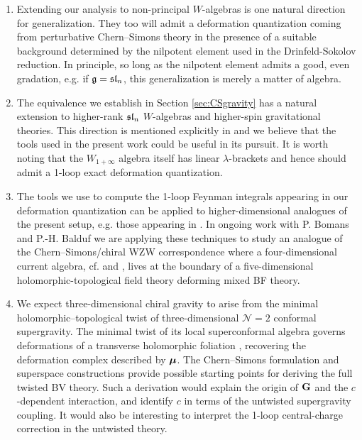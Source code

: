\documentclass[11pt]{amsart}
\numberwithin{equation}{section}
\numberwithin{figure}{section}
\numberwithin{table}{section}
\begin{document}
\begin{enumerate}
	\item Extending our analysis to non-principal $W$-algebras is one natural direction for generalization.
	They too will admit a deformation quantization coming from perturbative Chern--Simons theory in the presence of a suitable background determined by the nilpotent element used in the Drinfeld-Sokolov reduction.
	In principle, so long as the nilpotent element admits a good, even gradation, e.g. if $\mathfrak{g} = \mathfrak{sl}_n$, this generalization is merely a matter of algebra.
	\item The equivalence we establish in Section \ref{sec:CSgravity} has a natural extension to higher-rank $\mathfrak{sl}_n$ $W$-algebras and higher-spin gravitational theories.
	This direction is mentioned explicitly in \cite{Khan:2025rah} and we believe that the tools used in the present work could be useful in its pursuit.
	It is worth noting that the $W_{1+\infty}$ algebra itself has linear $\lambda$-brackets and hence should admit a 1-loop exact deformation quantization.
	\item The tools we use to compute the 1-loop Feynman integrals appearing in our deformation quantization can be applied to higher-dimensional analogues of the present setup, e.g. those appearing in \cite{Zeng:2026vry}.
	In ongoing work with P. Bomans and P.-H. Balduf we are applying these techniques to study an analogue of the Chern--Simons/chiral WZW correspondence where a four-dimensional current algebra, cf. \cite{Losev:1995cr, Losev:1996up, Losev1998} and \cite{Faonte2019389, Gwilliam:2018lpo}, lives at the boundary of a five-dimensional holomorphic-topological field theory deforming mixed BF theory.
	\item We expect three-dimensional chiral gravity to arise from the minimal holomorphic--topological twist of three-dimensional $\mathcal N=2$ conformal supergravity.
	The minimal twist of its local superconformal algebra governs deformations of a transverse holomorphic foliation \cite[Sec.~6.1]{Hahner:2024local}, recovering the deformation complex described by $\boldsymbol{\mu}$.
	The Chern--Simons formulation \cite{Rocek:1986conformal} and superspace constructions \cite{Kuzenko:2012prepotentials, Butter:2013actions} provide possible starting points for deriving the full twisted BV theory.
	Such a derivation would explain the origin of $\mathbf{G}$ and the $c$-dependent interaction, and identify $c$ in terms of the untwisted supergravity coupling.
	It would also be interesting to interpret the 1-loop central-charge correction in the untwisted theory.
\end{enumerate}
\end{document}
